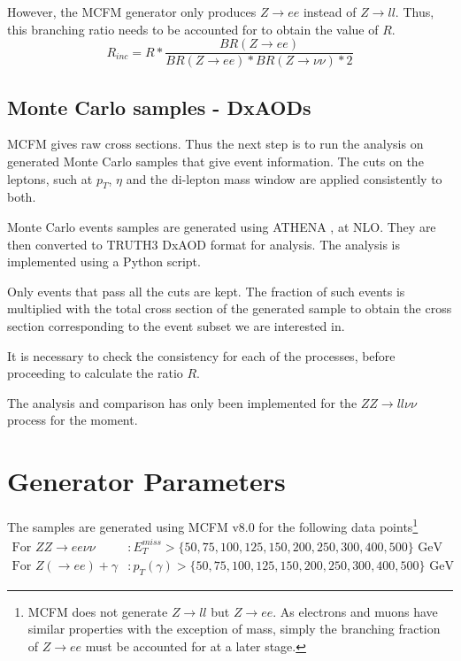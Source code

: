 \documentclass[11pt,a4paper,final]{report}
\begin{document}
However, the MCFM generator only produces $Z\rightarrow ee$ instead of $Z\rightarrow ll$. Thus, this branching ratio needs to be accounted for to obtain the value of $R$.
\begin{equation}\label{eq:R_inc}
	R_{inc} = R * \frac{BR(Z\rightarrow ee)}{BR(Z \rightarrow ee)*BR(Z\rightarrow \nu\nu)*2}
\end{equation}

\subsection*{Monte Carlo samples - DxAODs}
MCFM gives raw cross sections. Thus the next step is to run the analysis on generated Monte Carlo samples that give event information. The cuts on the leptons, such at $p_T$, $\eta$ and the di-lepton mass window are applied consistently to both.

Monte Carlo events samples are generated using ATHENA \cite{ATHENA}, at NLO. They are then converted to TRUTH3 DxAOD format for analysis. The analysis is implemented using a Python script.

Only events that pass all the cuts are kept. The fraction of such events is multiplied with the total cross section of the generated sample to obtain the cross section corresponding to the event subset we are interested in.

It is necessary to check the consistency for each of the processes, before proceeding to calculate the ratio $R$.

The analysis and comparison has only been implemented for the $ZZ \rightarrow ll\nu\nu$ process for the moment.

\section{Generator Parameters}
The samples are generated using MCFM v8.0 for the following data points\footnote{MCFM does not generate $Z\rightarrow ll$ but $Z\rightarrow ee$. As electrons and muons have similar properties with the exception of mass, simply the branching fraction of $Z\rightarrow ee$ must be accounted for at a later stage.}
\begin{align*}
	\text{For } ZZ \rightarrow ee\nu\nu &: E_T^{miss} > \{50,75,100,125,150,200,250,300,400,500\}\text{ GeV} \\
	\text{For } Z(\rightarrow ee)+\gamma &: p_T(\gamma) > \{50,75,100,125,150,200,250,300,400,500\}\text{ GeV}
\end{align*}
\end{document}
